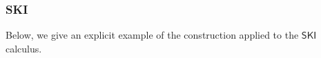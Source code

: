 \documentclass{llncs}
\renewcommand{\:}{\colon}
\newcommand{\red}{\rightarrow}
\begin{document}






\subsubsection{SKI}
Below, we give an explicit example of the construction applied to the $\mathsf{SKI}$ calculus.






\end{document}
